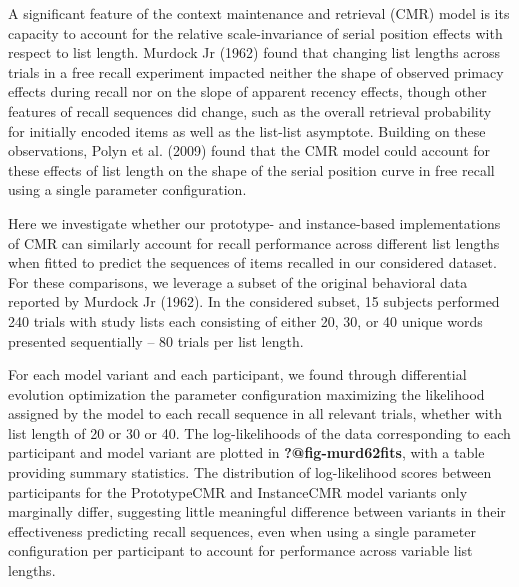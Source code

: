 \documentclass[
  letterpaper,
  DIV=11]{article}
\begin{document}
A significant feature of the context maintenance and retrieval (CMR)
model is its capacity to account for the relative scale-invariance of
serial position effects with respect to list length. Murdock Jr (1962)
found that changing list lengths across trials in a free recall
experiment impacted neither the shape of observed primacy effects during
recall nor on the slope of apparent recency effects, though other
features of recall sequences did change, such as the overall retrieval
probability for initially encoded items as well as the list-list
asymptote. Building on these observations, Polyn et al. (2009) found
that the CMR model could account for these effects of list length on the
shape of the serial position curve in free recall using a single
parameter configuration.

Here we investigate whether our prototype- and instance-based
implementations of CMR can similarly account for recall performance
across different list lengths when fitted to predict the sequences of
items recalled in our considered dataset. For these comparisons, we
leverage a subset of the original behavioral data reported by Murdock Jr
(1962). In the considered subset, 15 subjects performed 240 trials with
study lists each consisting of either 20, 30, or 40 unique words
presented sequentially -- 80 trials per list length.

For each model variant and each participant, we found through
differential evolution optimization the parameter configuration
maximizing the likelihood assigned by the model to each recall sequence
in all relevant trials, whether with list length of 20 or 30 or 40. The
log-likelihoods of the data corresponding to each participant and model
variant are plotted in \textbf{?@fig-murd62fits}, with a table providing
summary statistics. The distribution of log-likelihood scores between
participants for the PrototypeCMR and InstanceCMR model variants only
marginally differ, suggesting little meaningful difference between
variants in their effectiveness predicting recall sequences, even when
using a single parameter configuration per participant to account for
performance across variable list lengths.
\end{document}
